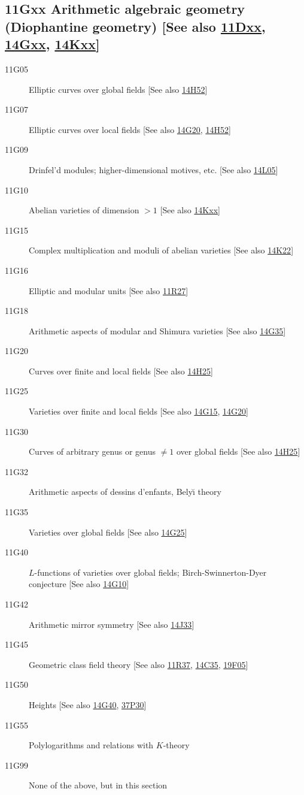 \documentclass[letterpaper]{article}
\begin{document}
\subsection*{11Gxx  Arithmetic algebraic geometry (Diophantine geometry) [See also \hyperref[11Dxx]{11Dxx}, \hyperref[14Gxx]{14Gxx}, \hyperref[14Kxx]{14Kxx}] }\label{11Gxx}
\begin{description}  
\item [11G05]\label{11G05} Elliptic curves over global fields [See also \hyperref[14H52]{14H52}]
\item [11G07]\label{11G07} Elliptic curves over local fields [See also \hyperref[14G20]{14G20}, \hyperref[14H52]{14H52}]
\item [11G09]\label{11G09} Drinfel'd modules; higher-dimensional motives, etc. [See also \hyperref[14L05]{14L05}]
\item [11G10]\label{11G10} Abelian varieties of dimension $> 1$ [See also \hyperref[14Kxx]{14Kxx}]
\item [11G15]\label{11G15} Complex multiplication and moduli of abelian varieties [See also \hyperref[14K22]{14K22}]
\item [11G16]\label{11G16} Elliptic and modular units [See also \hyperref[11R27]{11R27}]
\item [11G18]\label{11G18} Arithmetic aspects of modular and Shimura varieties [See also \hyperref[14G35]{14G35}]
\item [11G20]\label{11G20} Curves over finite and local fields [See also \hyperref[14H25]{14H25}]
\item [11G25]\label{11G25} Varieties over finite and local fields [See also \hyperref[14G15]{14G15}, \hyperref[14G20]{14G20}]
\item [11G30]\label{11G30} Curves of arbitrary genus or genus $\ne 1$ over global fields [See also \hyperref[14H25]{14H25}]
\item [11G32]\label{11G32} Arithmetic aspects of dessins d'enfants, Bely\u{\i} theory
\item [11G35]\label{11G35} Varieties over global fields [See also \hyperref[14G25]{14G25}]
\item [11G40]\label{11G40} $L$-functions of varieties over global fields; Birch-Swinnerton-Dyer conjecture [See also \hyperref[14G10]{14G10}]
\item [11G42]\label{11G42} Arithmetic mirror symmetry [See also \hyperref[14J33]{14J33}]
\item [11G45]\label{11G45} Geometric class field theory [See also \hyperref[11R37]{11R37}, \hyperref[14C35]{14C35}, \hyperref[19F05]{19F05}]
\item [11G50]\label{11G50} Heights [See also \hyperref[14G40]{14G40}, \hyperref[37P30]{37P30}]
\item [11G55]\label{11G55} Polylogarithms and relations with $K$-theory
\item [11G99]\label{11G99} None of the above, but in this section
\end{description}
\end{document}
